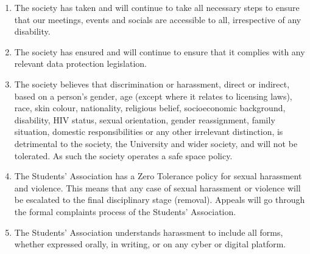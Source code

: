 \begin{enumerate}
    \item The society has taken and will continue to take all necessary steps to ensure that our meetings, events and socials are accessible to all, irrespective of any disability.

    \item The society has ensured and will continue to ensure that it complies with any relevant data protection legislation.

    \item The society believes that discrimination or harassment, direct or indirect, based on a person's gender, age (except where it relates to licensing laws), race, skin colour, nationality, religious belief, socioeconomic background, disability, HIV status, sexual orientation, gender reassignment, family situation, domestic responsibilities or any other irrelevant distinction, is detrimental to the society, the University and wider society, and will not be tolerated. As such the society operates a safe space policy.

    \item The Students' Association has a Zero Tolerance policy for sexual harassment and violence. This means that any case of sexual harassment or violence will be escalated to the final disciplinary stage (removal). Appeals will go through the formal complaints process of the Students' Association.

    \item The Students' Association understands harassment to include all forms, whether expressed orally, in writing, or on any cyber or digital platform.
    

\end{enumerate}
